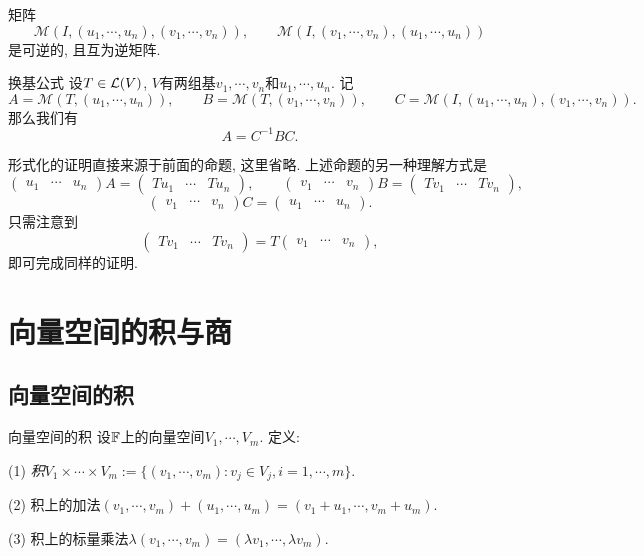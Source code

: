 \begin{example}
	矩阵$$\mathcal{M} (I,(u_1,\cdots ,u_n),(v_1,\cdots ,v_n)),\qquad \mathcal{M} (I,(v_1,\cdots ,v_n),(u_1,\cdots ,u_n))$$
	是可逆的, 且互为逆矩阵. 
\end{example}

\begin{proposition}{换基公式}
	设$T\in \mathcal{L} (V)$, $V$有两组基$v_1,\cdots ,v_n$和$u_1,\cdots ,u_n$. 记$$A = \mathcal{M}(T,(u_1,\cdots ,u_n)),\qquad B=\mathcal{M}(T,(v_1,\cdots ,v_n)),\qquad C=\mathcal{M}(I,(u_1,\cdots ,u_n),(v_1,\cdots ,v_n)).$$
	那么我们有$$A=C^{-1}BC.$$
\end{proposition}

形式化的证明直接来源于前面的命题, 这里省略. 上述命题的另一种理解方式是$$\begin{pmatrix}
 u_1 & \cdots & u_n
\end{pmatrix} A = \begin{pmatrix}
 Tu_1 & \cdots & Tu_n
\end{pmatrix},\qquad \begin{pmatrix}
 v_1 & \cdots & v_n
\end{pmatrix} B = \begin{pmatrix}
 Tv_1 & \cdots & Tv_n
\end{pmatrix}, $$
$$\begin{pmatrix}
 v_1 & \cdots & v_n
\end{pmatrix} C = \begin{pmatrix}
 u_1 & \cdots & u_n
\end{pmatrix}. $$
只需注意到$$\begin{pmatrix}
 Tv_1 & \cdots & Tv_n
\end{pmatrix} = T\begin{pmatrix}
 v_1 & \cdots & v_n
\end{pmatrix}, $$
即可完成同样的证明. 



\newpage
\section{向量空间的积与商}

\subsection{向量空间的积}

\begin{definition}{向量空间的积}
	设$\mathbb{F}$上的向量空间$V_1,\cdots, V_m$. 定义: 
	
	(1) \textit{积}$V_1 \times \cdots \times V_m := \{ (v_1,\cdots ,v_m):v_j \in V_j,i=1,\cdots ,m \}$. 
	
	(2) 积上的加法$(v_1,\cdots ,v_m)+(u_1,\cdots ,u_m) = (v_1+u_1,\cdots ,v_m+u_m)$. 
	
	(3) 积上的标量乘法$\lambda (v_1,\cdots ,v_m) = (\lambda v_1,\cdots ,\lambda v_m)$. 
\end{definition}

